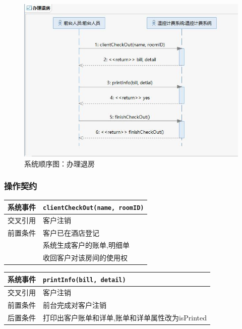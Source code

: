 \documentclass[black,normal,cn]{elegantnote}
\newcommand{\code}[1]{\colorbox{light-gray}{\texttt{#1}}}
\begin{document}
\begin{figure}[H]
    \centering
    \includegraphics[width=.8\textwidth]{fig/268003.png}
    \caption{系统顺序图：办理退房}
    \label{fig:268003}
\end{figure}

\subsubsection{操作契约}

\begin{center}
    \begin{tabular}{|>{\centering}m{}|m{}|}
        \hline
        系统事件 & \multicolumn{1}{l|}{\code{clientCheckOut(name, roomID)}} \\
        \hline
        交叉引用 & 客户注销                                                 \\
        \hline
        前置条件 & 客户已在酒店登记                                         \\
        \hline
        \multirow{2}{*}{后置条件}
                 & 系统生成客户的账单,明细单                                \\
        \cline{2-2}
                 & 收回客户对该房间的使用权                                 \\
        \hline
    \end{tabular}
\end{center}

\begin{center}
    \begin{tabular}{|>{\centering}m{}|m{}|}
        \hline
        系统事件   & \multicolumn{1}{l|}{\code{printInfo(bill, detail)}} \\
        \hline
        交叉引用   & 客户注销                                            \\
        \hline
        前置条件   & 前台完成对客户注销                                  \\
        \hline
        {后置条件} & 打印出客户账单和详单,账单和详单属性改为isPrinted    \\
        \hline
    \end{tabular}
\end{center}
\end{document}
